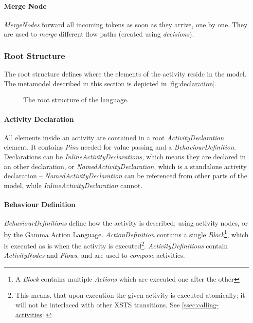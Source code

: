 \paragraph{Merge Node}

\emph{MergeNodes} forward all incoming tokens as soon as they arrive, one by one. They are used to \emph{merge} different flow paths (created using \emph{decisions}).

\subsubsection*{Root Structure}\label{ssec:root_structure}

The root structure defines where the elements of the activity reside in the model. The metamodel described in this section is depicted in \autoref{fig:declaration}.

\begin{figure}[!ht]
	\centering
	
	\caption{The root structure of the language.}
	\label{fig:declaration}
\end{figure}

\paragraph{Activity Declaration}

All elements inside an activity are contained in a root \emph{ActivityDeclaration} element. It contains \emph{Pins} needed for value passing and a \emph{BehaviourDefinition}. Declarations can be \emph{InlineActivityDeclarations}, which means they are declared in an other declaration, or \emph{NamedActivityDeclaration}, which is a standalone activity declaration -- \emph{NamedActivityDeclaration} can be referenced from other parts of the model, while \emph{InlineActivityDeclaration} cannot.

\paragraph{Behaviour Definition}

\emph{BehaviourDefinitions} define how the activity is described; using activity nodes, or by the Gamma Action Language. \emph{ActionDefinition} contains a single \emph{Block}\footnote{A \emph{Block} contains multiple \emph{Actions} which are executed one after the other}, which is executed as is when the activity is executed\footnote{This means, that upon execution the given activity is executed atomically; it will not be interlaced with other XSTS transitions. See \autoref{ssec:calling-activities}.}. \emph{ActivityDefinitions} contain \emph{ActivityNodes} and \emph{Flows}, and are used to \emph{compose} activities.

